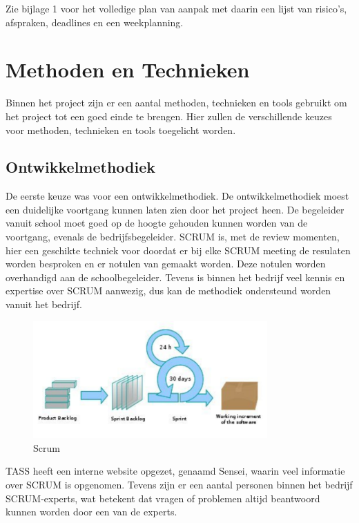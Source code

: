 \documentclass[]{article}
\begin{document}
Zie bijlage 1 voor het volledige plan van aanpak met daarin een lijst  van
risico's,  afspraken,  deadlines  en  een weekplanning.

\newpage
\section{Methoden en Technieken}

Binnen het project zijn er een aantal methoden, technieken en tools
gebruikt om het project tot een goed einde te brengen. Hier zullen de
verschillende keuzes voor methoden, technieken en tools toegelicht worden.

\subsection{Ontwikkelmethodiek}
De eerste keuze was voor een ontwikkelmethodiek. De ontwikkelmethodiek
moest een duidelijke voortgang kunnen laten zien door het project heen. De
begeleider vanuit school moet goed op de hoogte gehouden kunnen worden van
de voortgang, evenals de bedrijfsbegeleider. SCRUM is, met de review
momenten, hier een geschikte techniek voor doordat er bij elke SCRUM meeting de
resulaten worden besproken en er notulen van gemaakt worden. Deze notulen worden
overhandigd aan de schoolbegeleider. Tevens is binnen het bedrijf veel
kennis en expertise over SCRUM aanwezig, dus kan de methodiek ondersteund worden
vanuit het bedrijf.

\begin{figure}[htpb]
  \begin{center}
    \includegraphics[width=0.80\textwidth]{scrum.pdf}
  \end{center}
  \caption{Scrum}
\end{figure}

TASS heeft een interne website opgezet, genaamd Sensei, waarin
veel informatie over SCRUM is opgenomen. Tevens zijn er een
aantal personen binnen het bedrijf SCRUM-experts, wat betekent dat vragen of
problemen altijd beantwoord kunnen worden door een van de experts.
\end{document}
